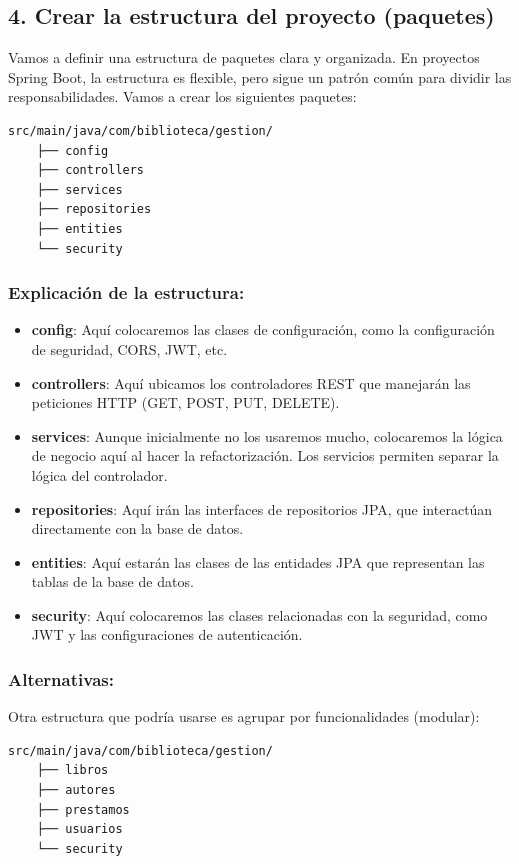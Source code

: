 \documentclass[11pt]{article}
\begin{document}
\subsection{4. Crear la estructura del proyecto (paquetes)}
\label{sec:orgd1e95a0}
Vamos a definir una estructura de paquetes clara y organizada. En proyectos Spring Boot, la estructura es flexible, pero sigue un patrón común para dividir las responsabilidades. Vamos a crear los siguientes paquetes:

\begin{verbatim}
src/main/java/com/biblioteca/gestion/
    ├── config
    ├── controllers
    ├── services
    ├── repositories
    ├── entities
    └── security
\end{verbatim}

\subsubsection{Explicación de la estructura:}
\label{sec:orgfe89c70}

\begin{itemize}
\item \textbf{\textbf{config}}: Aquí colocaremos las clases de configuración, como la configuración de seguridad, CORS, JWT, etc.
\item \textbf{\textbf{controllers}}: Aquí ubicamos los controladores REST que manejarán las peticiones HTTP (GET, POST, PUT, DELETE).
\item \textbf{\textbf{services}}: Aunque inicialmente no los usaremos mucho, colocaremos la lógica de negocio aquí al hacer la refactorización. Los servicios permiten separar la lógica del controlador.
\item \textbf{\textbf{repositories}}: Aquí irán las interfaces de repositorios JPA, que interactúan directamente con la base de datos.
\item \textbf{\textbf{entities}}: Aquí estarán las clases de las entidades JPA que representan las tablas de la base de datos.
\item \textbf{\textbf{security}}: Aquí colocaremos las clases relacionadas con la seguridad, como JWT y las configuraciones de autenticación.
\end{itemize}

\subsubsection{Alternativas:}
\label{sec:org0da4c9e}
Otra estructura que podría usarse es agrupar por funcionalidades (modular):
\begin{verbatim}
src/main/java/com/biblioteca/gestion/
    ├── libros
    ├── autores
    ├── prestamos
    ├── usuarios
    └── security
\end{verbatim}
\end{document}

